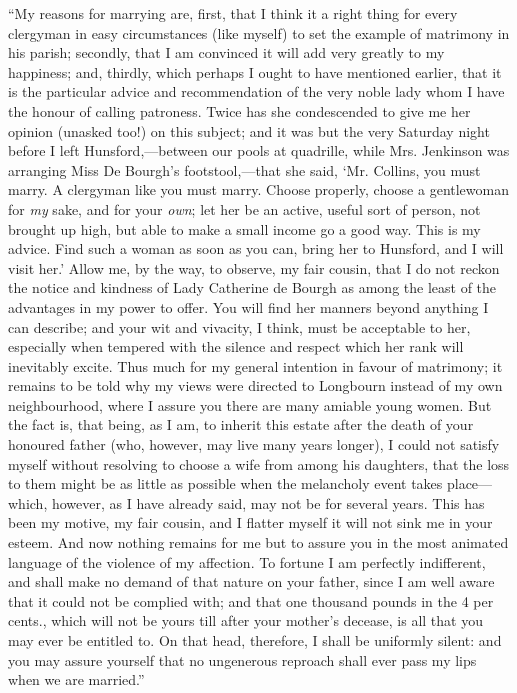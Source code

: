 \documentclass[12pt]{book}
\begin{document}
``My reasons for marrying are, first, that I think it a right thing for every clergyman in easy circumstances (like myself) to set the example of matrimony in his parish; secondly, that I am convinced it will add very greatly to my happiness; and, thirdly, which perhaps I ought to have mentioned earlier, that it is the particular advice and recommendation of the very noble lady whom I have the honour of calling patroness. Twice has she condescended to give me her opinion (unasked too!) on this subject; and it was but the very Saturday night before I left Hunsford,---between our pools at quadrille, while Mrs. Jenkinson was arranging Miss De Bourgh's footstool,---that she said, `Mr. Collins, you must marry. A clergyman like you must marry. Choose properly, choose a gentlewoman for \textit{my} sake, and for your \textit{own}; let her be an active, useful sort of person, not brought up high, but able to make a small income go a good way. This is my advice. Find such a woman as soon as you can, bring her to Hunsford, and I will visit her.' Allow me, by the way, to observe, my fair cousin, that I do not reckon the notice and kindness of Lady Catherine de Bourgh as among the least of the advantages in my power to offer. You will find her manners beyond anything I can describe; and your wit and vivacity, I think, must be acceptable to her, especially when tempered with the silence and respect which her rank will inevitably excite. Thus much for my general intention in favour of matrimony; it remains to be told why my views were directed to Longbourn instead of my own neighbourhood, where I assure you there are many amiable young women. But the fact is, that being, as I am, to inherit this estate after the death of your honoured father (who, however, may live many years longer), I could not satisfy myself without resolving to choose a wife from among his daughters, that the loss to them might be as little as possible when the melancholy event takes place---which, however, as I have already said, may not be for several years. This has been my motive, my fair cousin, and I flatter myself it will not sink me in your esteem. And now nothing remains for me but to assure you in the most animated language of the violence of my affection. To fortune I am perfectly indifferent, and shall make no demand of that nature on your father, since I am well aware that it could not be complied with; and that one thousand pounds in the 4 per cents., which will not be yours till after your mother's decease, is all that you may ever be entitled to. On that head, therefore, I shall be uniformly silent: and you may assure yourself that no ungenerous reproach shall ever pass my lips when we are married.''
\end{document}
